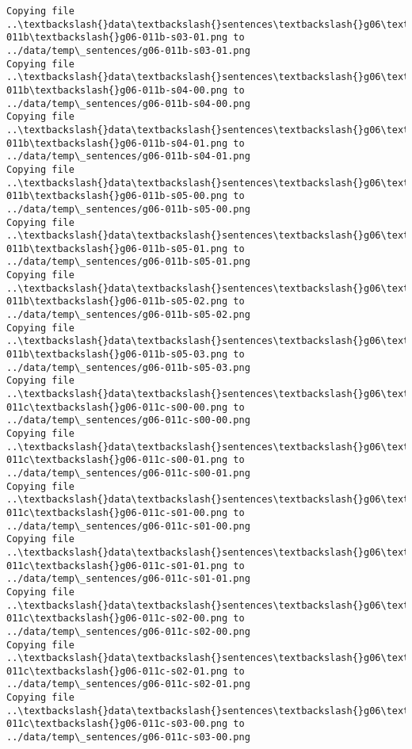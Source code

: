 \documentclass[11pt]{article}
\begin{document}
\begin{Verbatim}[commandchars=\\\{\}]
Copying file ..\textbackslash{}data\textbackslash{}sentences\textbackslash{}g06\textbackslash{}g06-011b\textbackslash{}g06-011b-s03-01.png to
../data/temp\_sentences/g06-011b-s03-01.png
Copying file ..\textbackslash{}data\textbackslash{}sentences\textbackslash{}g06\textbackslash{}g06-011b\textbackslash{}g06-011b-s04-00.png to
../data/temp\_sentences/g06-011b-s04-00.png
Copying file ..\textbackslash{}data\textbackslash{}sentences\textbackslash{}g06\textbackslash{}g06-011b\textbackslash{}g06-011b-s04-01.png to
../data/temp\_sentences/g06-011b-s04-01.png
Copying file ..\textbackslash{}data\textbackslash{}sentences\textbackslash{}g06\textbackslash{}g06-011b\textbackslash{}g06-011b-s05-00.png to
../data/temp\_sentences/g06-011b-s05-00.png
Copying file ..\textbackslash{}data\textbackslash{}sentences\textbackslash{}g06\textbackslash{}g06-011b\textbackslash{}g06-011b-s05-01.png to
../data/temp\_sentences/g06-011b-s05-01.png
Copying file ..\textbackslash{}data\textbackslash{}sentences\textbackslash{}g06\textbackslash{}g06-011b\textbackslash{}g06-011b-s05-02.png to
../data/temp\_sentences/g06-011b-s05-02.png
Copying file ..\textbackslash{}data\textbackslash{}sentences\textbackslash{}g06\textbackslash{}g06-011b\textbackslash{}g06-011b-s05-03.png to
../data/temp\_sentences/g06-011b-s05-03.png
Copying file ..\textbackslash{}data\textbackslash{}sentences\textbackslash{}g06\textbackslash{}g06-011c\textbackslash{}g06-011c-s00-00.png to
../data/temp\_sentences/g06-011c-s00-00.png
Copying file ..\textbackslash{}data\textbackslash{}sentences\textbackslash{}g06\textbackslash{}g06-011c\textbackslash{}g06-011c-s00-01.png to
../data/temp\_sentences/g06-011c-s00-01.png
Copying file ..\textbackslash{}data\textbackslash{}sentences\textbackslash{}g06\textbackslash{}g06-011c\textbackslash{}g06-011c-s01-00.png to
../data/temp\_sentences/g06-011c-s01-00.png
Copying file ..\textbackslash{}data\textbackslash{}sentences\textbackslash{}g06\textbackslash{}g06-011c\textbackslash{}g06-011c-s01-01.png to
../data/temp\_sentences/g06-011c-s01-01.png
Copying file ..\textbackslash{}data\textbackslash{}sentences\textbackslash{}g06\textbackslash{}g06-011c\textbackslash{}g06-011c-s02-00.png to
../data/temp\_sentences/g06-011c-s02-00.png
Copying file ..\textbackslash{}data\textbackslash{}sentences\textbackslash{}g06\textbackslash{}g06-011c\textbackslash{}g06-011c-s02-01.png to
../data/temp\_sentences/g06-011c-s02-01.png
Copying file ..\textbackslash{}data\textbackslash{}sentences\textbackslash{}g06\textbackslash{}g06-011c\textbackslash{}g06-011c-s03-00.png to
../data/temp\_sentences/g06-011c-s03-00.png

\end{Verbatim}
\end{document}
